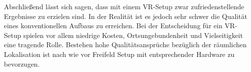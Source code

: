 

%
Abschließend lässt sich sagen, dass mit einem VR-Setup zwar zufriedenstellende Ergebnisse zu erzielen sind. In der Realität ist es jedoch sehr schwer die Qualität eines konventionellen Aufbaus zu erreichen. Bei der Entscheidung für ein VR-Setup spielen vor allem niedrige Kosten, Ortsungebundenheit und Vielseitigkeit eine tragende Rolle. Bestehen hohe Qualitätsansprüche bezüglich der räumlichen Lokalisation ist nach wie vor Freifeld Setup mit entsprechender Hardware zu bevorzugen.